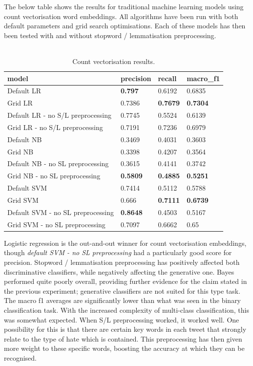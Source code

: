 \documentclass[conference]{IEEEtran}
\begin{document}
The below table shows the results for traditional machine learning models using count vectorisation word embeddings. All algorithms have been run with both default parameters and grid search optimisations. Each of these models has then been tested with and without stopword / lemmatisation preprocessing.
\begin{table}[H]
\centering
\begin{tabular}{|l|l|l|l|}
\hline
    model   & precision   & recall & macro\_f1     \\ \hline
Default LR &	\textbf{0.797} &	0.6192 &	0.6835\\
Grid LR &	0.7386 &	\textbf{0.7679} &	\textbf{0.7304}\\
Default LR - no S/L preprocessing &	0.7745 &	0.5524 &	0.6139\\
Grid LR - no S/L preprocessing &	0.7191 &	0.7236 &	0.6979\\ \hline

Default NB	& 0.3469 &	0.4031 &	0.3603\\
Grid NB	 & 0.3398 &	0.4207 &	0.3564\\
Default NB - no SL preprocessing &	0.3615 &	0.4141 &	0.3742\\
Grid NB - no SL preprocessing &	\textbf{0.5809} &	\textbf{0.4885} &	\textbf{0.5251}\\ \hline

Default SVM	 & 0.7414 &	0.5112 &	0.5788\\
Grid SVM	& 0.666 &	\textbf{0.7111} &	\textbf{0.6739}\\
Default SVM - no SL	preprocessing & \textbf{0.8648} &	0.4503 &	0.5167\\
Grid SVM - no SL preprocessing &	0.7097 &	0.6662 &	0.65\\ \hline
\end{tabular}
\caption{\label{tab:multi-LR-count-results}\\ Count vectorisation results.}
\end{table}

Logistic regression is the out-and-out winner for count vectorisation embeddings, though \textit{default SVM - no SL preprocessing} had a particularly good score for precision. Stopword / lemmatisation preprocessing has positively affected both discriminative classifiers, while negatively affecting the generative one. Bayes performed quite poorly overall, providing further evidence for the claim stated in the previous experiment; generative classifiers are not suited for this type task.
The macro f1 averages are significantly lower than what was seen in the binary classification task. With the increased complexity of multi-class classification, this was somewhat expected. When S/L preprocessing worked, it worked well. One possibility for this is that there are certain key words in each tweet that strongly relate to the type of hate which is contained. This preprocessing has then given more weight to these specific words, boosting the accuracy at which they can be recognised.
\end{document}
